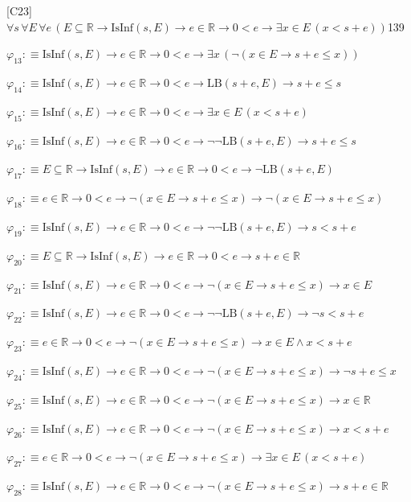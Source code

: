 \begin{fullproof}{[C23]}{$\forall s\,\forall E\,\forall e\,(E \subseteq \mathbb{R} \to \mathrm{IsInf}(s,E) \to e \in \mathbb{R} \to 0 < e \to \exists x \in E\,(x < s + e))$}{139}
\begin{abbrevlist}
\item $\varphi_{13} :\equiv \mathrm{IsInf}(s,E) \to e \in \mathbb{R} \to 0 < e \to \exists x\,(\neg (x \in E \to s + e \leq x))$
\item $\varphi_{14} :\equiv \mathrm{IsInf}(s,E) \to e \in \mathbb{R} \to 0 < e \to \mathrm{LB}(s + e,E) \to s + e \leq s$
\item $\varphi_{15} :\equiv \mathrm{IsInf}(s,E) \to e \in \mathbb{R} \to 0 < e \to \exists x \in E\,(x < s + e)$
\item $\varphi_{16} :\equiv \mathrm{IsInf}(s,E) \to e \in \mathbb{R} \to 0 < e \to \neg \neg \mathrm{LB}(s + e,E) \to s + e \leq s$
\item $\varphi_{17} :\equiv E \subseteq \mathbb{R} \to \mathrm{IsInf}(s,E) \to e \in \mathbb{R} \to 0 < e \to \neg \mathrm{LB}(s + e,E)$
\item $\varphi_{18} :\equiv e \in \mathbb{R} \to 0 < e \to \neg (x \in E \to s + e \leq x) \to \neg (x \in E \to s + e \leq x)$
\item $\varphi_{19} :\equiv \mathrm{IsInf}(s,E) \to e \in \mathbb{R} \to 0 < e \to \neg \neg \mathrm{LB}(s + e,E) \to s < s + e$
\item $\varphi_{20} :\equiv E \subseteq \mathbb{R} \to \mathrm{IsInf}(s,E) \to e \in \mathbb{R} \to 0 < e \to s + e \in \mathbb{R}$
\item $\varphi_{21} :\equiv \mathrm{IsInf}(s,E) \to e \in \mathbb{R} \to 0 < e \to \neg (x \in E \to s + e \leq x) \to x \in E$
\item $\varphi_{22} :\equiv \mathrm{IsInf}(s,E) \to e \in \mathbb{R} \to 0 < e \to \neg \neg \mathrm{LB}(s + e,E) \to \neg s < s + e$
\item $\varphi_{23} :\equiv e \in \mathbb{R} \to 0 < e \to \neg (x \in E \to s + e \leq x) \to x \in E \land x < s + e$
\item $\varphi_{24} :\equiv \mathrm{IsInf}(s,E) \to e \in \mathbb{R} \to 0 < e \to \neg (x \in E \to s + e \leq x) \to \neg s + e \leq x$
\item $\varphi_{25} :\equiv \mathrm{IsInf}(s,E) \to e \in \mathbb{R} \to 0 < e \to \neg (x \in E \to s + e \leq x) \to x \in \mathbb{R}$
\item $\varphi_{26} :\equiv \mathrm{IsInf}(s,E) \to e \in \mathbb{R} \to 0 < e \to \neg (x \in E \to s + e \leq x) \to x < s + e$
\item $\varphi_{27} :\equiv e \in \mathbb{R} \to 0 < e \to \neg (x \in E \to s + e \leq x) \to \exists x \in E\,(x < s + e)$
\item $\varphi_{28} :\equiv \mathrm{IsInf}(s,E) \to e \in \mathbb{R} \to 0 < e \to \neg (x \in E \to s + e \leq x) \to s + e \in \mathbb{R}$

\end{abbrevlist}
\end{fullproof}
